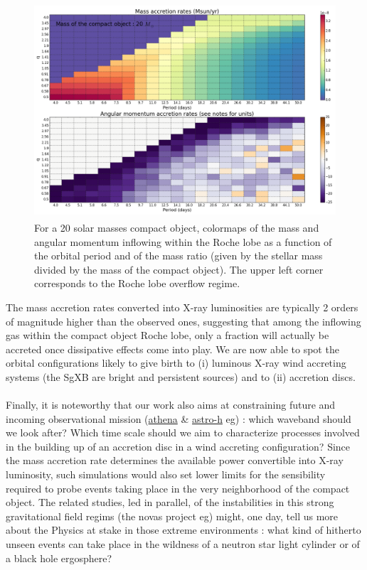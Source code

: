 \documentclass[
    a4paper, 
    12pt, onecolumn,
]{article}
\begin{document}
\begin{figure}
\begin{center}
\includegraphics[height=8cm, width=13cm]{20sun_masses.png}
\caption{For a 20 solar masses compact object, colormaps of the mass and angular momentum inflowing within the Roche lobe as a function of the orbital period and of the mass ratio (given by the stellar mass divided by the mass of the compact object). The upper left corner corresponds to the Roche lobe overflow regime.}
\label{fig:mdot}
\end{center}
\end{figure} 
 The mass accretion rates converted into X-ray luminosities are typically 2 orders of magnitude higher than the observed ones, suggesting that among the inflowing gas within the compact object Roche lobe, only a fraction will actually be accreted once dissipative effects come into play. We are now able to spot the orbital configurations likely to give birth to (i) luminous X-ray wind accreting systems (the SgXB are bright and persistent sources) and to (ii) accretion discs. \\
\\
\indent Finally, it is noteworthy that our work also aims at constraining future and incoming observational mission (\href{http://www.the-athena-x-ray-observatory.eu}{{\sc athena}} \& \href{http://astro-h.isas.jaxa.jp/en/}{{\sc astro-h}} eg) : which waveband should we look after? Which time scale should we aim to characterize processes involved in the building up of an accretion disc in a wind accreting configuration? Since the mass accretion rate determines the available power convertible into X-ray luminosity, such simulations would also set lower limits for the sensibility required to probe events taking place in the very neighborhood of the compact object. The related studies, led in parallel, of the instabilities in this strong gravitational field regims (the {\sc nova}s project eg) might, one day, tell us more about the Physics at stake in those extreme environments : what kind of hitherto unseen events can take place in the wildness of a neutron star light cylinder or of a black hole ergosphere?
\end{document}
